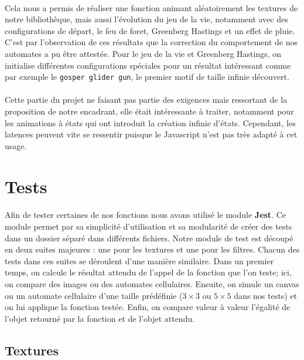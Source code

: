 \documentclass[a4paper]{article}
\begin{document}
\paragraph{}
Cela nous a permis de réaliser une fonction animant aléatoirement les textures de notre bibliothèque, mais aussi l'évolution du jeu de la vie, notamment avec des configurations de départ, le feu de foret, Greenberg Hastings et un effet de pluie. C'est par l'observation de ces résultats que la correction du comportement de nos automates a pu être attestée. Pour le jeu de la vie et Greenberg Hastings, on initialise différentes configurations spéciales pour un résultat intéressant comme par exemple le \texttt{gosper glider gun}, le premier motif de taille infinie découvert.

\paragraph{}
Cette partie du projet ne faisant pas partie des exigences mais ressortant de la proposition de notre encadrant, elle était intéressante à traiter, notamment pour les animations à états qui ont introduit la création infinie d'états. Cependant, les latences peuvent vite se ressentir puisque le Javascript n'est pas très adapté à cet usage.

\section{Tests}
\paragraph{}
Afin de tester certaines de nos fonctions nous avons utilisé le module \textbf{Jest}. Ce module permet par sa simplicité d'utilisation et sa modularité de créer des tests dans un dossier séparé dans différents fichiers. Notre module de test est découpé en deux suites majeures : une pour les textures et une pour les filtres. Chacun des tests dans ces suites se déroulent d'une manière similaire. Dans un premier temps, on calcule le résultat attendu de l'appel de la fonction que l'on teste; ici, on compare des images ou des automates cellulaires. Ensuite, on simule un canvas ou un automate cellulaire d'une taille prédéfinie ($3 \times 3$ ou $5 \times 5$ dans nos tests) et on lui applique la fonction testée. Enfin, on compare valeur à valeur l'égalité de l'objet retourné par la fonction et de l'objet attendu.

\subsection{Textures}
\label{texturestest}
\end{document}

